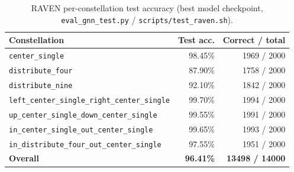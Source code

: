 \begin{table}[h]
\centering
\begin{tabular}{|l|r|r|}
\hline
Constellation & Test acc. & Correct / total \\
\hline
\texttt{center\_single} & 98.45\% & 1969 / 2000 \\
\hline
\texttt{distribute\_four} & 87.90\% & 1758 / 2000 \\
\hline
\texttt{distribute\_nine} & 92.10\% & 1842 / 2000 \\
\hline
\texttt{left\_center\_single\_right\_center\_single} & 99.70\% & 1994 / 2000 \\
\hline
\texttt{up\_center\_single\_down\_center\_single} & 99.55\% & 1991 / 2000 \\
\hline
\texttt{in\_center\_single\_out\_center\_single} & 99.65\% & 1993 / 2000 \\
\hline
\texttt{in\_distribute\_four\_out\_center\_single} & 97.55\% & 1951 / 2000 \\
\hline
\textbf{Overall} & \textbf{96.41\%} & \textbf{13498 / 14000} \\
\hline
\end{tabular}
\caption{RAVEN per-constellation test accuracy (best model checkpoint, \texttt{eval\_gnn\_test.py} / \texttt{scripts/test\_raven.sh}).}
\end{table}
